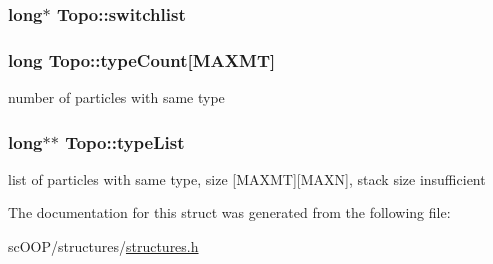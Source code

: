 \hypertarget{struct_topo_a0ecb4fc994f31c3d02d78b150df71057}{
\subsubsection[{switchlist}]{\setlength{\rightskip}{0pt plus 5cm}long$\ast$ Topo\+::switchlist}}\label{struct_topo_a0ecb4fc994f31c3d02d78b150df71057}
\hypertarget{struct_topo_ac2097d6a83653e5c5d4e48095a05fd3b}{
\subsubsection[{type\+Count}]{\setlength{\rightskip}{0pt plus 5cm}long Topo\+::type\+Count\mbox{[}{\bf M\+A\+X\+M\+T}\mbox{]}}}\label{struct_topo_ac2097d6a83653e5c5d4e48095a05fd3b}


number of particles with same type 

\hypertarget{struct_topo_a22f7e415c3b4f361dfe7c5198d258640}{
\subsubsection[{type\+List}]{\setlength{\rightskip}{0pt plus 5cm}long$\ast$$\ast$ Topo\+::type\+List}}\label{struct_topo_a22f7e415c3b4f361dfe7c5198d258640}


list of particles with same type, size \mbox{[}M\+A\+X\+M\+T\mbox{]}\mbox{[}M\+A\+X\+N\mbox{]}, stack size insufficient 



The documentation for this struct was generated from the following file\+:\begin{DoxyCompactItemize}
\item 
sc\+O\+O\+P/structures/\hyperlink{structures_8h}{structures.\+h}\end{DoxyCompactItemize}
